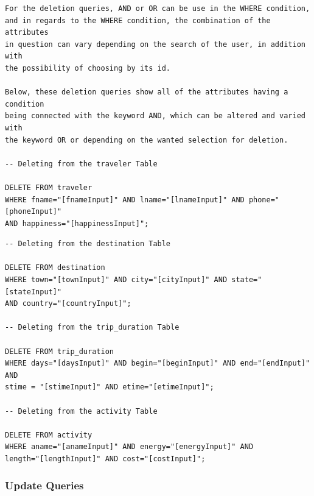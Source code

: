 \documentclass[letterpaper,10pt,onecolumn,compsoc]{IEEEtran}
\begin{document}
\begin{verbatim}
For the deletion queries, AND or OR can be use in the WHERE condition, 
and in regards to the WHERE condition, the combination of the attributes 
in question can vary depending on the search of the user, in addition with 
the possibility of choosing by its id. 

Below, these deletion queries show all of the attributes having a condition 
being connected with the keyword AND, which can be altered and varied with 
the keyword OR or depending on the wanted selection for deletion.

-- Deleting from the traveler Table

DELETE FROM traveler 
WHERE fname="[fnameInput]" AND lname="[lnameInput]" AND phone="[phoneInput]" 
AND happiness="[happinessInput]";
\end{verbatim}

\newpage

\begin{verbatim}
-- Deleting from the destination Table

DELETE FROM destination 
WHERE town="[townInput]" AND city="[cityInput]" AND state="[stateInput]" 
AND country="[countryInput]";

-- Deleting from the trip_duration Table

DELETE FROM trip_duration 
WHERE days="[daysInput]" AND begin="[beginInput]" AND end="[endInput]" AND 
stime = "[stimeInput]" AND etime="[etimeInput]";

-- Deleting from the activity Table

DELETE FROM activity 
WHERE aname="[anameInput]" AND energy="[energyInput]" AND
length="[lengthInput]" AND cost="[costInput]";
\end{verbatim}

\subsubsection{Update Queries}
\end{document}
